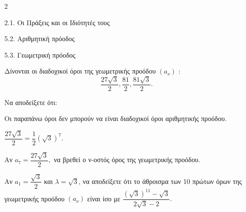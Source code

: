 \begin{ylh}{2}
    \item 2.1. Οι Πράξεις και οι Ιδιότητές τους
    \item 5.2. Αριθμητική πρόοδος
    \item 5.3. Γεωμετρική πρόοδος
\end{ylh}
Δίνονται οι διαδοχικοί όροι της γεωμετρικής προόδου $(a_{\nu})$ : \[\dfrac{27\sqrt{3}}{2},\dfrac{81}{2},\dfrac{81\sqrt{3}}{2}.\]
\begin{alist}
\item Να αποδείξετε ότι:
\begin{rlist}
\item
  Οι παραπάνω όροι δεν μπορούν να είναι διαδοχικοί όροι αριθμητικής προόδου.
\item
  $\dfrac{27\sqrt{3}}{2} = \dfrac{1}{2}\left( \sqrt{3} \right)^{7}.$
\end{rlist}
\item Αν $a_{7} = \dfrac{27\sqrt{3}}{2},$ να βρεθεί ο ν-οστός όρος της γεωμετρικής προόδου.
\item Αν $a_{1} = \dfrac{\sqrt{3}}{2}$ και $\lambda = \sqrt{3}$, να αποδείξετε ότι το άθροισμα των 10 πρώτων όρων της γεωμετρικής προόδου $(a_{\nu})$ είναι ίσο με $\dfrac{\left( \sqrt{3} \right)^{11} - \sqrt{3}}{2\sqrt{3} - 2}.$
\end{alist}

